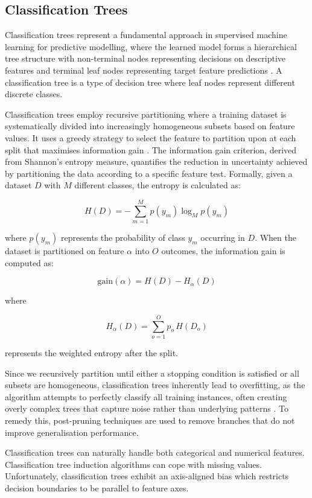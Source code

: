 \documentclass[10pt, conference]{IEEEtran}
\begin{document}
\subsection{Classification Trees}
Classification trees represent a fundamental approach in supervised machine learning for predictive modelling, where the learned model forms a hierarchical tree structure with non-terminal nodes representing decisions on descriptive features and terminal leaf nodes representing target feature predictions \cite{quinlan1993c45}. A classification tree is a type of decision tree where leaf nodes represent different discrete classes.

Classification trees employ recursive partitioning where a training dataset is systematically divided into increasingly homogeneous subsets based on feature values. It uses a greedy strategy to select the feature to partition upon at each split that maximises information gain \cite{kelleher2020fundamentals}. The information gain criterion, derived from Shannon's entropy measure, quantifies the reduction in uncertainty achieved by partitioning the data according to a specific feature test.
Formally, given a dataset $D$ with $M$ different classes, the entropy is calculated as:

\[
H(D) = -\sum_{m=1}^{M} p(y_m) \log_{M} p(y_m)
\]

where $p(y_m)$ represents the probability of class $y_m$ occurring in $D$. When the dataset is partitioned on feature $\alpha$ into $O$ outcomes, the information gain is computed as:

\[
\text{gain}(\alpha) = H(D) - H_\alpha(D)
\]

where 

\[
H_\alpha(D) = \sum_{o=1}^{O} p_o \, H(D_o)
\]

represents the weighted entropy after the split.

Since we recursively partition until either a stopping condition is satisfied or all subsets are homogeneous, classification trees inherently lead to overfitting, as the algorithm attempts to perfectly classify all training instances, often creating overly complex trees that capture noise rather than underlying patterns \cite{quinlan1993c45}. To remedy this, post-pruning techniques are used to remove branches that do not improve generalisation performance.

Classification trees can naturally handle both categorical and numerical features. Classification tree induction algorithms can cope with missing values. Unfortunately, classification trees exhibit an axis-aligned bias which restricts decision boundaries to be parallel to feature axes.
\end{document}

